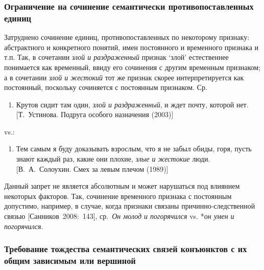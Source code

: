 \subsubsection{Ограничение на сочинение семантически противопоставленных
единиц}\label{ux43eux433ux440ux430ux43dux438ux447ux435ux43dux438ux435-ux43dux430-ux441ux43eux447ux438ux43dux435ux43dux438ux435-ux441ux435ux43cux430ux43dux442ux438ux447ux435ux441ux43aux438-ux43fux440ux43eux442ux438ux432ux43eux43fux43eux441ux442ux430ux432ux43bux435ux43dux43dux44bux445-ux435ux434ux438ux43dux438ux446}

Затруднено сочинение единиц, противопоставленных по некоторому признаку:
абстрактного и конкретного понятий, имен постоянного и временного
признака и т.п. Так, в сочетании \textit{злой и раздраженный} признак
`злой' естественнее понимается как временный, ввиду его сочинения с
другим временным признаком; а в сочетании \textit{злой и жестокий} тот же
признак скорее интерпретируется как постоянный, поскольку сочиняется с
постоянным признаком. Ср.

\begin{enumerate}
\def\labelenumi{(\arabic{enumi})}
\setcounter{enumi}{14}
\item
  Крутов сидит там один, \textit{злой и раздраженный}, и ждет почту,
  которой нет. {[}Т.~Устинова. Подруга особого назначения (2003){]}
\end{enumerate}

vs.:

\begin{enumerate}
\def\labelenumi{(\arabic{enumi})}
\setcounter{enumi}{15}
\item
  Тем самым я буду доказывать взрослым, что я не забыл обиды, горя,
  пусть знают каждый раз, какие они плохие, \textit{злые и жестокие} люди.
  {[}В.~А.~Солоухин. Смех за левым плечом (1989){]}
\end{enumerate}

Данный запрет не является абсолютным и может нарушаться под влиянием
некоторых факторов. Так, сочинение временного признака с постоянным
допустимо, например, в случае, когда признаки связаны
причинно-следственной связью {[}Санников~2008:~143{]}, ср.~\textit{Он
молод и погорячился} vs. *\textit{он умен и погорячился}.

\subsubsection{Требование тождества семантических связей конъюнктов с их
общим зависимым или
вершиной}\label{ux442ux440ux435ux431ux43eux432ux430ux43dux438ux435-ux442ux43eux436ux434ux435ux441ux442ux432ux430-ux441ux435ux43cux430ux43dux442ux438ux447ux435ux441ux43aux438ux445-ux441ux432ux44fux437ux435ux439-ux43aux43eux43dux44aux44eux43dux43aux442ux43eux432-ux441-ux438ux445-ux43eux431ux449ux438ux43c-ux437ux430ux432ux438ux441ux438ux43cux44bux43c-ux438ux43bux438-ux432ux435ux440ux448ux438ux43dux43eux439}


